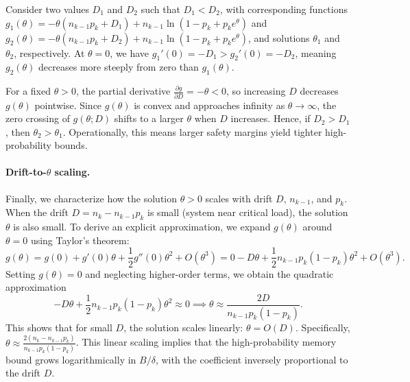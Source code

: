 Consider two values \(D_1\) and \(D_2\) such that \(D_1 < D_2\), with corresponding functions \(g_1(\theta) = -\theta (n_{k-1} p_k + D_1) + n_{k-1} \ln(1 - p_k + p_k e^{\theta})\) and \(g_2(\theta) = -\theta (n_{k-1} p_k + D_2) + n_{k-1} \ln(1 - p_k + p_k e^{\theta})\), and solutions \(\theta_1\) and \(\theta_2\), respectively. At \(\theta = 0\), we have \(g_1'(0) = -D_1 > g_2'(0) = -D_2\), meaning \(g_2(\theta)\) decreases more steeply from zero than \(g_1(\theta)\).

For a fixed \(\theta > 0\), the partial derivative \(\frac{\partial g}{\partial D} = -\theta < 0\), so increasing \(D\) decreases \(g(\theta)\) pointwise. Since \(g(\theta)\) is convex and approaches infinity as \(\theta \to \infty\), the zero crossing of \(g(\theta; D)\) shifts to a larger \(\theta\) when \(D\) increases. Hence, if \(D_2 > D_1\), then \(\theta_2 > \theta_1\). Operationally, this means larger safety margins yield tighter high-probability bounds.

\paragraph{Drift-to-$\theta$ scaling.} Finally, we characterize how the solution \(\theta>0\) scales with drift \(D\), \(n_{k-1}\), and \(p_k\). When the drift \(D = n_k - n_{k-1} p_k\) is small (system near critical load), the solution \(\theta\) is also small. To derive an explicit approximation, we expand \(g(\theta)\) around \(\theta = 0\) using Taylor's theorem:
$$g(\theta) = g(0) + g'(0) \theta + \frac{1}{2} g''(0) \theta^2 + O(\theta^3) = 0 - D \theta + \frac{1}{2} n_{k-1} p_k (1 - p_k) \theta^2 + O(\theta^3).$$
Setting \(g(\theta) = 0\) and neglecting higher-order terms, we obtain the quadratic approximation
$$-D \theta + \frac{1}{2} n_{k-1} p_k (1 - p_k) \theta^2 \approx 0 \implies \theta \approx \frac{2D}{n_{k-1} p_k (1 - p_k)}.$$
This shows that for small \(D\), the solution scales linearly: \(\theta = O(D)\). Specifically, $\theta \approx \frac{2 (n_k - n_{k-1} p_k)}{n_{k-1} p_k (1 - p_k)}$. This linear scaling implies that the high-probability memory bound grows logarithmically in $B/\delta$, with the coefficient inversely proportional to the drift $D$.

